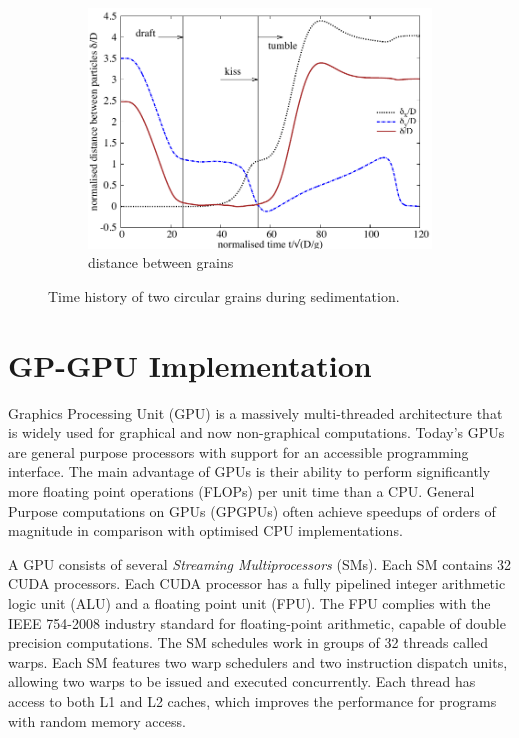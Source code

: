 \begin{figure}[tbhp]
\begin{subfigure}[b]{0.475\textwidth}
		\includegraphics[width=\textwidth]{Kissing_delta}
		\caption{distance between grains}
		\label{fig:kissdelta}
	\end{subfigure}
	\caption{Time history of two circular grains during sedimentation.}
	\label{fig:kiss}
\end{figure}

\section{GP-GPU Implementation}

Graphics Processing Unit (GPU) is a massively multi-threaded architecture that 
is widely used for graphical and now non-graphical computations. Today's GPUs 
are general purpose processors with support for an accessible programming 
interface. The main advantage of GPUs is their ability to perform significantly 
more floating point operations (FLOPs) per unit time than a CPU. General 
Purpose computations on GPUs (GPGPUs) often achieve speedups of orders of 
magnitude in comparison with optimised CPU implementations. 

A GPU consists of several \emph{Streaming Multiprocessors} (SMs). Each SM 
contains 32 CUDA processors. Each CUDA processor has a fully pipelined integer 
arithmetic logic unit (ALU) and a floating point unit (FPU). The FPU complies 
with the IEEE 754-2008 industry standard for floating-point arithmetic, capable 
of double precision computations. The SM schedules work in groups of 32 threads 
called warps. Each SM features two warp schedulers and two instruction dispatch 
units, allowing two warps to be issued and executed concurrently. Each thread 
has access to both L1 and L2 caches, which improves the performance for 
programs with random memory access.

